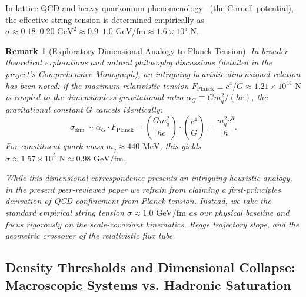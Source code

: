 \documentclass[11pt,a4paper]{article}
\newtheorem{remark}{Remark}[section]
\begin{document}
In lattice QCD and heavy-quarkonium phenomenology~\cite{wilson1974,eichten1978} (the Cornell potential), the effective string tension is determined empirically as $\sigma \approx 0.18\text{--}0.20\text{ GeV}^2 \approx 0.9\text{--}1.0\text{ GeV/fm} \approx 1.6 \times 10^5\text{ N}$.

\begin{remark}[Exploratory Dimensional Analogy to Planck Tension]
    \label{rem:planck_boyut_en}
    In broader theoretical explorations and natural philosophy discussions (detailed in the project's Comprehensive Monograph), an intriguing heuristic dimensional relation has been noted: if the maximum relativistic tension $F_{\mathrm{Planck}} \equiv c^4/G \approx 1.21 \times 10^{44}\text{ N}$ is coupled to the dimensionless gravitational ratio $\alpha_G \equiv G m_q^2 / (\hbar c)$, the gravitational constant $G$ cancels identically:
    \begin{equation}
        \sigma_{\mathrm{dim}} \sim \alpha_G \cdot F_{\mathrm{Planck}} = \left( \frac{G m_q^2}{\hbar c} \right) \cdot \left( \frac{c^4}{G} \right) = \frac{m_q^2 c^3}{\hbar}.
        \label{eq:sigma_tam_analitik_en}
    \end{equation}
    For constituent quark mass $m_q \approx 440\text{ MeV}$, this yields $\sigma \approx 1.57 \times 10^5\text{ N} \approx 0.98\text{ GeV/fm}$.
    
    While this dimensional correspondence presents an intriguing heuristic analogy, in the present peer-reviewed paper we refrain from claiming a first-principles derivation of QCD confinement from Planck tension. Instead, we take the standard empirical string tension $\sigma \approx 1.0\text{ GeV/fm}$ as our physical baseline and focus rigorously on the scale-covariant kinematics, Regge trajectory slope, and the geometric crossover of the relativistic flux tube.
\end{remark}

\subsection{Density Thresholds and Dimensional Collapse: Macroscopic Systems vs. Hadronic Saturation}
\label{sec:yogunluk_ve_boyut}
\end{document}
